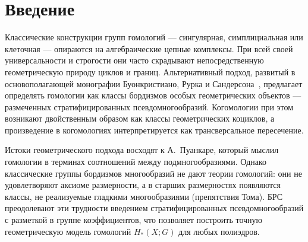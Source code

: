 \documentclass[12pt]{article}
\begin{document}
\pagestyle{empty}



\begin{abstract}
В курсовой работе излагается геометрический подход к гомологиям и когомологиям полиэдров, восходящий к монографии Буонкристиано, Рурка и Сандерсона~\cite{BRS} и дополненный вычислительными приёмами из книги Фенна~\cite{Fenn}. Гомологические классы реализуются как классы бордизмов размеченных стратифицированных псевдомногообразий, а когомологии --- как коориентированные коциклы. $\smile$-произведение интерпретируется как трансверсальное пересечение. Приводятся основные определения, доказывается эквивалентность сингулярным гомологиям и демонстрируются примеры вычислений.

Данная работа является частью проекта по созданию учебника по введению в геометрическую топологию, рассчитанного на студентов младших курсов и мотивированных школьников. В курсовой работе представлена часть будущей книги, посвящённая основаниям геометрических гомологий и когомологий.
\end{abstract}

\tableofcontents
\pagestyle{empty}
\pagebreak
\pagestyle{fancy}

\section{Введение}

Классические конструкции групп гомологий --- сингулярная, симплициальная или клеточная --- опираются на алгебраические цепные комплексы. При всей своей универсальности и строгости они часто скрадывают непосредственную геометрическую природу циклов и границ. Альтернативный подход, развитый в основополагающей монографии Буонкристиано, Рурка и Сандерсона~\cite{BRS}, предлагает определять гомологии как классы бордизмов особых геометрических объектов --- размеченных стратифицированных псевдомногообразий. Когомологии при этом возникают двойственным образом как классы геометрических коциклов, а произведение в когомологиях интерпретируется как трансверсальное пересечение.

Истоки геометрического подхода восходят к А.~Пуанкаре, который мыслил гомологии в терминах соотношений между подмногообразиями. Однако классические группы бордизмов многообразий не дают теории гомологий: они не удовлетворяют аксиоме размерности, а в старших размерностях появляются классы, не реализуемые гладкими многообразиями (препятствия Тома). БРС преодолевают эти трудности введением стратифицированных псевдомногообразий с разметкой в группе коэффициентов, что позволяет построить точную геометрическую модель гомологий $H_*(X;G)$ для любых полиэдров.
\end{document}
